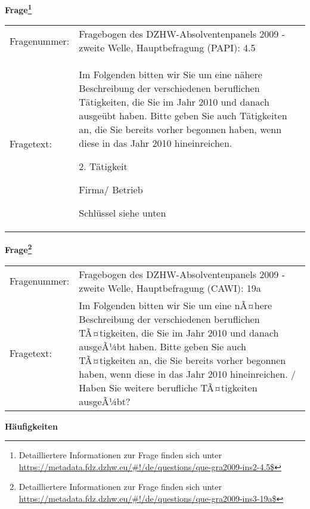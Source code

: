 				\vspace*{0.5cm}
                \noindent\textbf{Frage\footnote{Detailliertere Informationen zur Frage finden sich unter
		              \url{https://metadata.fdz.dzhw.eu/\#!/de/questions/que-gra2009-ins2-4.5$}}}\\
				\begin{tabularx}{\hsize}{@{}lX}
					Fragenummer: &
					  Fragebogen des DZHW-Absolventenpanels 2009 - zweite Welle, Hauptbefragung (PAPI):
					  4.5
 \\
					Fragetext: & Im Folgenden bitten wir Sie um eine nähere Beschreibung der verschiedenen beruflichen Tätigkeiten, die Sie im Jahr 2010 und danach ausgeübt haben. Bitte geben Sie auch Tätigkeiten an, die Sie bereits vorher begonnen haben, wenn diese in das Jahr 2010 hineinreichen.\par  2. Tätigkeit\par  Firma/ Betrieb\par  Schlüssel siehe unten \\
				\end{tabularx}
				\vspace*{0.5cm}
                \noindent\textbf{Frage\footnote{Detailliertere Informationen zur Frage finden sich unter
		              \url{https://metadata.fdz.dzhw.eu/\#!/de/questions/que-gra2009-ins3-19a$}}}\\
				\begin{tabularx}{\hsize}{@{}lX}
					Fragenummer: &
					  Fragebogen des DZHW-Absolventenpanels 2009 - zweite Welle, Hauptbefragung (CAWI):
					  19a
 \\
					Fragetext: & Im Folgenden bitten wir Sie um eine nÃ¤here Beschreibung der verschiedenen beruflichen TÃ¤tigkeiten, die Sie im Jahr 2010 und danach ausgeÃ¼bt haben. Bitte geben Sie auch TÃ¤tigkeiten an, die Sie bereits vorher begonnen haben, wenn diese in das Jahr 2010 hineinreichen. / Haben Sie weitere berufliche TÃ¤tigkeiten ausgeÃ¼bt? \\
				\end{tabularx}





        		\vspace*{0.5cm}
                \noindent\textbf{Häufigkeiten}

